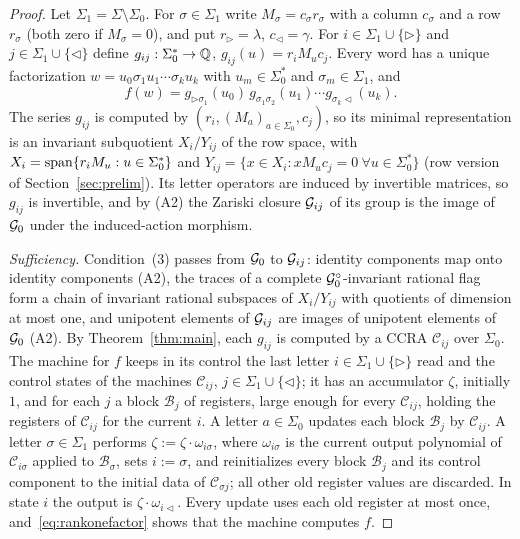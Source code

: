 \begin{proof}
Let $\Sigma_1=\Sigma\setminus\Sigma_0$. For $\sigma\in\Sigma_1$ write $M_\sigma=c_\sigma r_\sigma$ with a column $c_\sigma$ and a row $r_\sigma$ (both zero if $M_\sigma=0$), and put $r_\triangleright=\lambda$, $c_\triangleleft=\gamma$. For $i\in\Sigma_1\cup\{\triangleright\}$ and $j\in\Sigma_1\cup\{\triangleleft\}$ define $g_{ij}:\Sigma_0^*\to\mathbb{Q}$, $g_{ij}(u)=r_iM_uc_j$. Every word has a unique factorization $w=u_0\sigma_1u_1\cdots\sigma_ku_k$ with $u_m\in\Sigma_0^*$ and $\sigma_m\in\Sigma_1$, and
\begin{equation}\label{eq:rankonefactor}
f(w)=g_{\triangleright\sigma_1}(u_0)\,g_{\sigma_1\sigma_2}(u_1)\cdots g_{\sigma_k\triangleleft}(u_k).
\end{equation}
The series $g_{ij}$ is computed by $(r_i,(M_a)_{a\in\Sigma_0},c_j)$, so its minimal representation is an invariant subquotient $X_i/Y_{ij}$ of the row space, with $X_i=\operatorname{span}\{r_iM_u:u\in\Sigma_0^*\}$ and $Y_{ij}=\{x\in X_i:xM_uc_j=0\ \forall u\in\Sigma_0^*\}$ (row version of Section~\ref{sec:prelim}). Its letter operators are induced by invertible matrices, so $g_{ij}$ is invertible, and by (A2) the Zariski closure $\mathcal{G}_{ij}$ of its group is the image of $\mathcal{G}_0$ under the induced-action morphism.

\emph{Sufficiency.} Condition~(3) passes from $\mathcal{G}_0$ to $\mathcal{G}_{ij}$: identity components map onto identity components (A2), the traces of a complete $\mathcal{G}_0^\circ$-invariant rational flag form a chain of invariant rational subspaces of $X_i/Y_{ij}$ with quotients of dimension at most one, and unipotent elements of $\mathcal{G}_{ij}$ are images of unipotent elements of $\mathcal{G}_0$ (A2). By Theorem~\ref{thm:main}, each $g_{ij}$ is computed by a CCRA $\mathcal C_{ij}$ over $\Sigma_0$. The machine for $f$ keeps in its control the last letter $i\in\Sigma_1\cup\{\triangleright\}$ read and the control states of the machines $\mathcal C_{ij}$, $j\in\Sigma_1\cup\{\triangleleft\}$; it has an accumulator $\zeta$, initially $1$, and for each $j$ a block $\mathcal B_j$ of registers, large enough for every $\mathcal C_{ij}$, holding the registers of $\mathcal C_{ij}$ for the current $i$. A letter $a\in\Sigma_0$ updates each block $\mathcal B_j$ by $\mathcal C_{ij}$. A letter $\sigma\in\Sigma_1$ performs $\zeta:=\zeta\cdot\omega_{i\sigma}$, where $\omega_{i\sigma}$ is the current output polynomial of $\mathcal C_{i\sigma}$ applied to $\mathcal B_\sigma$, sets $i:=\sigma$, and reinitializes every block $\mathcal B_j$ and its control component to the initial data of $\mathcal C_{\sigma j}$; all other old register values are discarded. In state $i$ the output is $\zeta\cdot\omega_{i\triangleleft}$. Every update uses each old register at most once, and~\eqref{eq:rankonefactor} shows that the machine computes $f$.


\end{proof}
